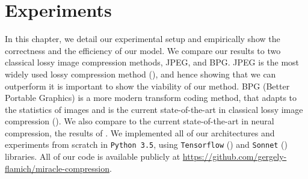 
\chapter{Experiments}
\label{chapter:experiments}

\graphicspath{{../img/plots/vae_latents/}{../img/plots/kodak_comparison/}{../img/plots/kodak_coding_time/}{../img/plots/kodak_side_info/}{../img/plots/reconstructions/}}

\label{sec:experimental_results}
\par
In this chapter, we detail our experimental setup and empirically show the
correctness and the efficiency of our model. We compare our results to
two classical lossy image compression methods, JPEG, and BPG. JPEG is the most
widely used lossy compression method (\cite{bull2014communicating}), and hence
showing that we can outperform it is important to show the viability of our
method. BPG (Better Portable Graphics) is a more modern transform coding method,
that adapts to the statistics of images and is the current state-of-the-art in
classical lossy image compression (\cite{rippel2017real}).
We also compare to the current state-of-the-art in neural compression, the results of
\cite{balle2018variational}\footnotemark. We implemented all of our
architectures and experiments from scratch in \texttt{Python 3.5}, using \texttt{Tensorflow}
(\cite{tensorflow2015-whitepaper}) and \texttt{Sonnet} (\cite{sonnetblog})
libraries. All of our code is available publicly at
\url{https://github.com/gergely-flamich/miracle-compression}. 


